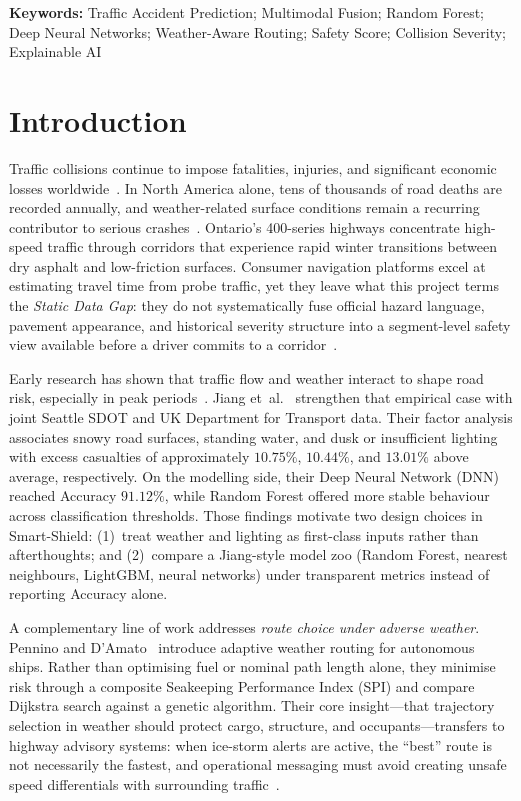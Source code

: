 \documentclass[11pt,a4paper]{article}
\begin{document}
\noindent\textbf{Keywords:} Traffic Accident Prediction; Multimodal Fusion; Random Forest; Deep Neural Networks; Weather-Aware Routing; Safety Score; Collision Severity; Explainable AI

\tableofcontents
\newpage

\section{Introduction}
\label{sec:intro}

Traffic collisions continue to impose fatalities, injuries, and significant economic losses worldwide~\citep{jiang2024traffic,transport_canada_2023}. In North America alone, tens of thousands of road deaths are recorded annually, and weather-related surface conditions remain a recurring contributor to serious crashes~\citep{theofilatos2014}. Ontario's 400-series highways concentrate high-speed traffic through corridors that experience rapid winter transitions between dry asphalt and low-friction surfaces. Consumer navigation platforms excel at estimating travel time from probe traffic, yet they leave what this project terms the \emph{Static Data Gap}: they do not systematically fuse official hazard language, pavement appearance, and historical severity structure into a segment-level safety view available before a driver commits to a corridor~\citep{ontario511}.

Early research has shown that traffic flow and weather interact to shape road risk, especially in peak periods~\citep{theofilatos2014}. Jiang et~al.~\citep{jiang2024traffic} strengthen that empirical case with joint Seattle SDOT and UK Department for Transport data. Their factor analysis associates snowy road surfaces, standing water, and dusk or insufficient lighting with excess casualties of approximately $10.75\%$, $10.44\%$, and $13.01\%$ above average, respectively. On the modelling side, their Deep Neural Network (DNN) reached Accuracy $91.12\%$, while Random Forest offered more stable behaviour across classification thresholds. Those findings motivate two design choices in Smart-Shield: (1)~treat weather and lighting as first-class inputs rather than afterthoughts; and (2)~compare a Jiang-style model zoo (Random Forest, nearest neighbours, LightGBM, neural networks) under transparent metrics instead of reporting Accuracy alone.

A complementary line of work addresses \emph{route choice under adverse weather}. Pennino and D'Amato~\citep{pennino2024weather} introduce adaptive weather routing for autonomous ships. Rather than optimising fuel or nominal path length alone, they minimise risk through a composite Seakeeping Performance Index (SPI) and compare Dijkstra search against a genetic algorithm. Their core insight---that trajectory selection in weather should protect cargo, structure, and occupants---transfers to highway advisory systems: when ice-storm alerts are active, the ``best'' route is not necessarily the fastest, and operational messaging must avoid creating unsafe speed differentials with surrounding traffic~\citep{ahmad2022speed}.
\end{document}
